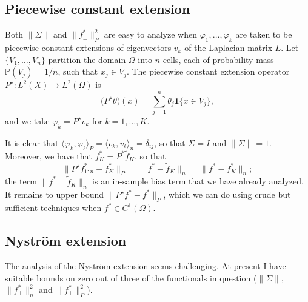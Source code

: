 \documentclass{article}
\newcommand{\1}{\mathbf{1}}
\newcommand{\Pbb}{\mathbb{P}}
\newcommand{\dotp}[2]{\langle #1, #2 \rangle}
\newcommand{\wt}[1]{\widetilde{#1}}
\theoremstyle{definition}
\theoremstyle{remark}
\begin{document}
\subsection{Piecewise constant extension}
Both $\|\Sigma\|$ and $\|f_{\perp}^{\ast}\|_P^2$ are easy to analyze when $\varphi_1,\ldots,\varphi_k$ are taken to be piecewise constant extensions of eigenvectors $v_k$ of the Laplacian matrix $L$.
Let $\{V_1,\ldots,V_n\}$ partition the domain $\Omega$ into $n$ cells, each of probability mass $\Pbb(V_j) = 1/n$, such that $x_j \in V_j$. The piecewise constant extension operator $P^{\star}: L^2(X)\to L^2(\Omega)$ is
\begin{equation}
\label{eqn:piecewise_extension}
\bigl(P^{\star}\theta\bigr)(x) = \sum_{j = 1}^{n} \theta_j \1\{x \in V_j\},
\end{equation}
and we take $\varphi_k = P^{\star}v_k$ for $k = 1,\ldots,K$.

It is clear that $\dotp{{\varphi}_k}{{\varphi}_{\ell}}_{P} = \dotp{v_k}{v_{\ell}}_{n} = \delta_{ij}$, so that $\Sigma = I$ and $\|\Sigma\| = 1$. Moreover, we have that $f_K^{\ast} = P^{\ast}\wt{f}_K$, so that
\begin{equation*}
\|P^{\star}f_{1:n}^{\ast} - {f}_K^{\ast}\|_P = \|f^{\ast} - \wt{f}_K\|_n = \|f^{\ast} - f_K^{\ast}\|_n;
\end{equation*}
the term $\|f^{\ast} - \wt{f}_K\|_n$ is an in-sample bias term that we have already analyzed. It remains to upper bound $\|P^{\star}f^{\ast} - f^{\ast}\|_P$, which we can do using crude but sufficient techniques when $f^{\ast} \in C^1(\Omega)$. 

\subsection{Nystr\"{o}m extension}

The analysis of the Nystr\"{o}m extension seems challenging. At present I have suitable bounds on zero out of three of the functionals in question ($\|\Sigma\|$, $\|f_{\perp}^{\ast}\|_n^2$ and $\|f_{\perp}^{\ast}\|_P^2$). 
\end{document}
